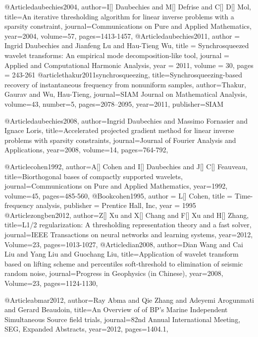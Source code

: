 @Article{daubechies2004,
  author={I[] Daubechies and M[] Defrise and C[] D[] Mol},
  title={An iterative thresholding algorithm for linear inverse problems with a sparsity constraint},
  journal={Communications on Pure and Applied Mathematics},
  year=2004,
  volume=57,
  pages={1413-1457},
}
@Article{daubechies2011,
  author = 	 {Ingrid Daubechies and Jianfeng Lu and Hau-Tieng Wu},
  title = 	 {Synchrosqueezed wavelet transforms: An empirical mode decomposition-like tool},
  journal = 	 {Applied and Computational Harmonic Analysis},
  year = 	 2011,
  volume = 	 30,
  pages = 	 {243-261}
}
@article{thakur2011synchrosqueezing,
  title={Synchrosqueezing-based recovery of instantaneous frequency from nonuniform samples},
  author={Thakur, Gaurav and Wu, Hau-Tieng},
  journal={SIAM Journal on Mathematical Analysis},
  volume={43},
  number={5},
  pages={2078--2095},
  year={2011},
  publisher={SIAM}
}


@Article{daubechies2008,
  author={Ingrid Daubechies and Massimo Fornasier and Ignace Loris},
  title={Accelerated projected gradient method for linear inverse problems with sparsity constraints},
  journal={Journal of {F}ourier Analysis and Applications},
  year=2008,
  volume=14,
  pages={764-792},
}

@Article{cohen1992,
  author={A[] Cohen and I[] Daubechies and J[] C[] Feauveau},
  title={Biorthogonal bases of compactly supported wavelets},
  journal={Communications on Pure and Applied Mathematics},
  year=1992,
  volume=45,
  pages={485-560},
}
@Book{cohen1995,
  author = 	 {L[] Cohen},
  title = 	 { Time-frequency analysis},
  publisher = 	 {Prentice Hall, Inc},
  year = 	 1995}
@Article{zongben2012,
  author={Z[] Xu and X[] Chang and F[] Xu and H[] Zhang},
  title={{L}1/2 regularization: A thresholding representation theory and a fast solver},
  journal={IEEE Transactions on neural networks and learning systems},
  year=2012,
  Volume=23,
  pages={1013-1027},
}
@Article{dian2008,
  author={Dian Wang and Cai Liu and Yang Liu and Guochang Liu},
  title={Application of wavelet transform based on lifting scheme and percentiles soft-threshold to elimination of seismic random noise},
  journal={Progress in Geophysics (in Chinese)},
  year=2008,
  Volume=23,
  pages={1124-1130},
}


@Article{abmar2012,
  author={Ray Abma and Qie Zhang and Adeyemi Arogunmati and Gerard Beaudoin},
  title={An Overview of of {BP}'s Marine Independent Simultaneous Source field trials},
  journal={82nd Annual International Meeting, SEG, Expanded Abstracts},
  year=2012,
  pages={1404.1},
}

